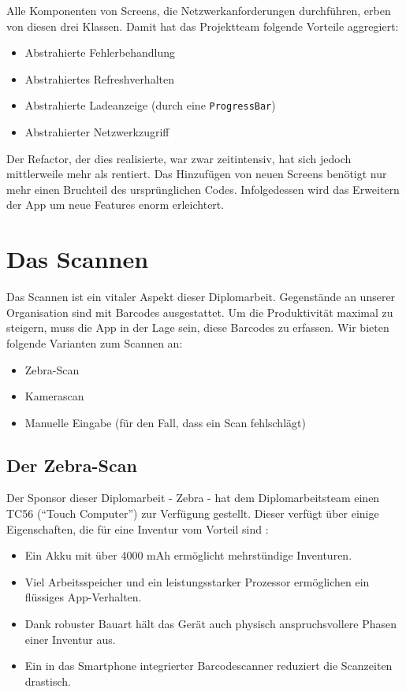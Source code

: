 Alle Komponenten von Screens, die Netzwerkanforderungen durchführen,
erben von diesen drei Klassen. Damit hat das Projektteam folgende
Vorteile aggregiert:

\begin{itemize}
\tightlist
\item
  Abstrahierte Fehlerbehandlung
\item
  Abstrahiertes Refreshverhalten
\item
  Abstrahierte Ladeanzeige (durch eine \texttt{ProgressBar})
\item
  Abstrahierter Netzwerkzugriff
\end{itemize}

Der Refactor, der dies realisierte, war zwar zeitintensiv, hat sich
jedoch mittlerweile mehr als rentiert. Das Hinzufügen von neuen Screens
benötigt nur mehr einen Bruchteil des ursprünglichen Codes.
Infolgedessen wird das Erweitern der App um neue Features enorm
erleichtert.

\chapter{Das Scannen}

Das Scannen ist ein vitaler Aspekt dieser Diplomarbeit. Gegenstände an
unserer Organisation sind mit Barcodes ausgestattet. Um die
Produktivität maximal zu steigern, muss die App in der Lage sein, diese
Barcodes zu erfassen. Wir bieten folgende Varianten zum Scannen an:

\begin{itemize}
\tightlist
\item
  Zebra-Scan
\item
  Kamerascan
\item
  Manuelle Eingabe (für den Fall, dass ein Scan fehlschlägt)
\end{itemize}

\hypertarget{der-zebra-scan}{%
\section{Der Zebra-Scan}\label{der-zebra-scan}}

Der Sponsor dieser Diplomarbeit - Zebra - hat dem Diplomarbeitsteam
einen TC56 (``Touch Computer'') zur Verfügung gestellt. Dieser verfügt
über einige Eigenschaften, die für eine Inventur vom Vorteil sind
\cite{zebra-tc56}:

\begin{itemize}
\tightlist
\item
  Ein Akku mit über 4000 mAh ermöglicht mehrstündige Inventuren.
\item
  Viel Arbeitsspeicher und ein leistungsstarker Prozessor ermöglichen
  ein flüssiges App-Verhalten.
\item
  Dank robuster Bauart hält das Gerät auch physisch anspruchsvollere
  Phasen einer Inventur aus.
\item
  Ein in das Smartphone integrierter Barcodescanner reduziert die
  Scanzeiten drastisch.
\end{itemize}

